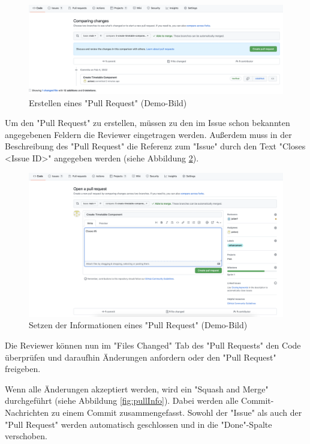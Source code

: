 \begin{figure}[H]
    \centering
    \includegraphics[width=\textwidth]{media/ProjectManagement/CreatePull.png}
    \caption{Erstellen eines "Pull Request" (Demo-Bild)}
    \label{fig:createPullRequest}
\end{figure}

Um den "Pull Request" zu erstellen, müssen zu den im Issue schon bekannten angegebenen Feldern die Reviewer eingetragen werden. 
Außerdem muss in der Beschreibung des "Pull Request" die Referenz zum "Issue" durch den Text "Closes \textless Issue ID\textgreater" angegeben werden (siehe Abbildung \ref{fig:EnterPullRequestInfo}).

\begin{figure}[H]
    \centering
    \includegraphics[width=\textwidth]{media/ProjectManagement/EnterPullInfo.png}
    \caption{Setzen der Informationen eines "Pull Request" (Demo-Bild)}
    \label{fig:EnterPullRequestInfo}
\end{figure}

Die Reviewer können nun im "Files Changed" Tab des "Pull Requests" den Code überprüfen und daraufhin Änderungen anfordern oder den "Pull Request" freigeben. 

Wenn alle Änderungen akzeptiert werden, wird ein "Squash and Merge" durchgeführt (siehe Abbildung \ref{fig:pullInfo}).
Dabei werden alle Commit-Nachrichten  zu einem Commit zusammen\-gefasst. 
Sowohl der "Issue" als auch der "Pull Request" werden automatisch geschlossen und in die "Done"-Spalte verschoben.
\cite{GithubFS}

